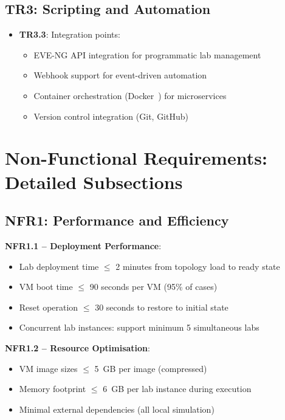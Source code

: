 \subsection{TR3: Scripting and Automation}

\begin{itemize}

\item \textbf{TR3.3}: Integration points:
\begin{itemize}
\item EVE-NG API integration for programmatic lab management
\item Webhook support for event-driven automation
\item Container orchestration (Docker~\cite{docker}) for microservices
\item Version control integration (Git, GitHub)
\end{itemize}

\end{itemize}

\section{Non-Functional Requirements: Detailed Subsections}

\subsection{NFR1: Performance and Efficiency}

\textbf{NFR1.1 -- Deployment Performance}:
\begin{itemize}
\item Lab deployment time $\leq$ 2 minutes from topology load to ready state
\item VM boot time $\leq$ 90 seconds per VM (95\% of cases)
\item Reset operation $\leq$ 30 seconds to restore to initial state
\item Concurrent lab instances: support minimum 5 simultaneous labs
\end{itemize}

\textbf{NFR1.2 -- Resource Optimisation}:
\begin{itemize}
\item VM image sizes $\leq$ 5~GB per image (compressed)
\item Memory footprint $\leq$ 6~GB per lab instance during execution
\item Minimal external dependencies (all local simulation)
\end{itemize}

